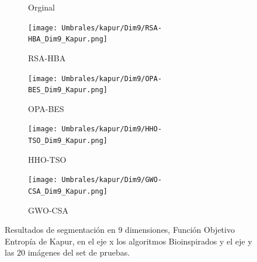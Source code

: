\documentclass[conference]{IEEEtran}
\begin{document}
\begin{figure}[!htb]
\begin{subfigure}[b]{0.13\textwidth}
		\caption{Orginal}
		\label{fig:imgOrginal}
	\end{subfigure}
	\begin{subfigure}[b]{0.13\textwidth}
		\texttt{[image: Umbrales/kapur/Dim9/RSA-HBA\_Dim9\_Kapur.png]}
		\caption{RSA-HBA}
		\label{fig:imagen1}
	\end{subfigure}
	\begin{subfigure}[b]{0.13\textwidth}
		\texttt{[image: Umbrales/kapur/Dim9/OPA-BES\_Dim9\_Kapur.png]}
		\caption{OPA-BES}
		\label{fig:imagen2}
	\end{subfigure}
	\begin{subfigure}[b]{0.13\textwidth}
		\texttt{[image: Umbrales/kapur/Dim9/HHO-TSO\_Dim9\_Kapur.png]}
		\caption{HHO-TSO}
		\label{fig:imagen2}
	\end{subfigure}
	\begin{subfigure}[b]{0.13\textwidth}
		\texttt{[image: Umbrales/kapur/Dim9/GWO-CSA\_Dim9\_Kapur.png]}
		\caption{GWO-CSA}
		\label{fig:imagen2}
	\end{subfigure}
	
	
	\caption{Resultados de segmentación en 9 dimensiones, Función Objetivo Entropía de Kapur, en el eje x los algoritmos Bioinspirados y el eje y las 20 imágenes del set de pruebas.}
	\label{fig:resultados7dim}
\end{figure}
\end{document}
